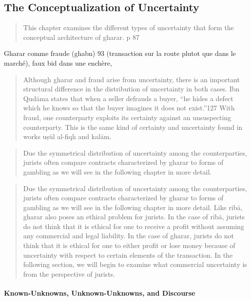 \subsection{The Conceptualization of Uncertainty}
\begin{quote}
This chapter examines the different types of uncertainty that form the conceptual
architecture of gharar. p 87
\end{quote}
 
 Gharar comme fraude (ghabn) 93 (transaction sur la route plutot que dans le marché), faux bid dans une enchère,
 
 \begin{quote}
     Although gharar and fraud arise from uncertainty, there is an important structural
difference in the distribution of uncertainty in both cases. Ibn Qudāma states that when a
seller defrauds a buyer, “he hides a defect which he knows so that the buyer imagines it
does not exist.”127 With fraud, one counterparty exploits its certainty against an
unsuspecting counterparty. This is the same kind of certainty and uncertainty found in
works uṣūl al-fiqh and kalām.
 \end{quote}
 
 \begin{quote}
     Due the symmetrical distribution of
uncertainty among the counterparties, jurists often compare contracts characterized by
gharar to forms of gambling as we will see in the following chapter in more detail.
 \end{quote}
 
 \begin{quote}
     Due the symmetrical distribution of
uncertainty among the counterparties, jurists often compare contracts characterized by
gharar to forms of gambling as we will see in the following chapter in more detail. Like
ribā, gharar also poses an ethical problem for jurists. In the case of ribā, jurists do not
think that it is ethical for one to receive a profit without assuming any commercial and
legal liability. In the case of gharar, jurists do not think that it is ethical for one to either
profit or lose money because of uncertainty with respect to certain elements of the
transaction. In the following section, we will begin to examine what commercial
uncertainty is from the perspective of jurists.
 \end{quote}
 
 \paragraph{Known-Unknowns, Unknown-Unknowns, and Discourse}
 
